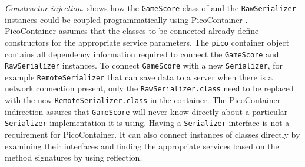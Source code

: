 \begin{dinglist}{43}

\item \textit{Constructor injection}.  shows how the \texttt{Ga\-me\-Sco\-re} class of  and the \texttt{Raw\-Se\-ria\-li\-zer} instances could be coupled programmatically using PicoContainer \cite{java.picocont}. PicoContainer assumes that the classes to be connected already define constructors for the appropriate service parameters. 
The \texttt{pico} container object contains all dependency information required to connect the \texttt{Ga\-me\-Sco\-re} and \texttt{Raw\-Se\-ria\-li\-zer} instances. To connect \texttt{Ga\-meSco\-re} with a new \texttt{Se\-ria\-li\-zer}, for example \texttt{Remo\-teSeria\-li\-zer} that can save data to a server when there is a network connection present, only the \texttt{Raw\-Se\-ria\-li\-zer.class} need to be replaced with the new \texttt{Remo\-te\-Se\-ria\-lizer\-.class} in the container. The PicoContainer indirection assures that \texttt{Ga\-me\-Sco\-re} will never know directly about a particular \texttt{Se\-ria\-li\-zer} implementation it is using. Having a \texttt{Se\-ria\-li\-zer} interface is not a requirement for PicoContainer. It can also connect instances of classes directly by examining their interfaces and finding the appropriate services based on the method signatures by using reflection. 


\end{dinglist}
